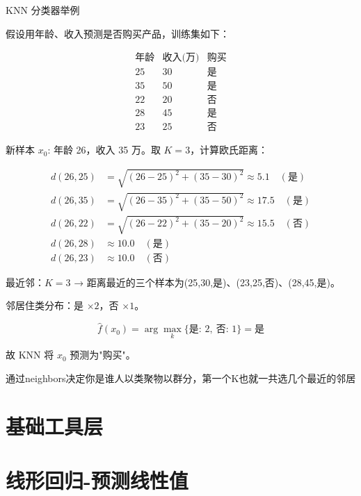 \begin{note}{KNN 分类器举例}

假设用年龄、收入预测是否购买产品，训练集如下：

\[
\begin{array}{ccc}
\text{年龄} & \text{收入(万)} & \text{购买} \\ \hline
25 & 30 & \text{是} \\
35 & 50 & \text{是} \\
22 & 20 & \text{否} \\
28 & 45 & \text{是} \\
23 & 25 & \text{否}
\end{array}
\]

新样本 $x_0$: 年龄 26，收入 35 万。取 $K=3$，计算欧氏距离：

\[
\begin{aligned}
d(26, 25) &= \sqrt{(26-25)^2 + (35-30)^2} \approx 5.1 \quad (\text{是})\\
d(26, 35) &= \sqrt{(26-35)^2 + (35-50)^2} \approx 17.5 \quad (\text{是})\\
d(26, 22) &= \sqrt{(26-22)^2 + (35-20)^2} \approx 15.5 \quad (\text{否})\\
d(26, 28) &\approx 10.0 \quad (\text{是})\\
d(26, 23) &\approx 10.0 \quad (\text{否})
\end{aligned}
\]

最近邻：$K=3$ → 距离最近的三个样本为(25,30,是)、(23,25,否)、(28,45,是)。

邻居住类分布：是 $\times 2$，否 $\times 1$。

\[
\hat{f}(x_0) = \arg\max_k \{ \text{是: }2,\ \text{否: }1 \} = \text{是}
\]

故 KNN 将 $x_0$ 预测为"购买"。

\end{note}
\begin{dxtips}
    通过neighbors决定你是谁人以类聚物以群分，第一个K也就一共选几个最近的邻居
\end{dxtips}
\chapter{基础工具层}

\chapter{线形回归-预测线性值}

